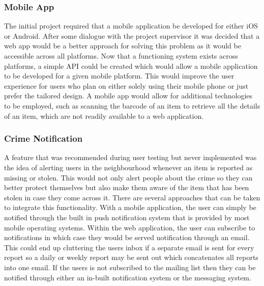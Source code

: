 \subsubsection{Mobile App}
The initial project required that a mobile application be developed for either iOS or Android. After some dialogue with the project supervisor it was decided that a web app would be a better approach for solving this problem as it would be accessible across all platforms. Now that a functioning system exists across platforms, a simple API could be created which would allow a mobile application to be developed for a given mobile platform. This would improve the user experience for users who plan on either solely using their mobile phone or just prefer the tailored design. A mobile app would allow for additional technologies to be employed, such as scanning the barcode of an item to retrieve all the details of an item, which are not readily available to a web application.

\subsubsection{Crime Notification}
A feature that was recommended during user testing but never implemented was the idea of alerting users in the neighbourhood whenever an item is reported as missing or stolen. This would not only alert people about the crime so they can better protect themselves but also make them aware of the item that has been stolen in case they come across it. There are several approaches that can be taken to integrate this functionality. With a mobile application, the user can simply be notified through the built in push notification system that is provided by most mobile operating systems. Within the web application, the user can subscribe to notifications in which case they would be served notification through an email. This could end up cluttering the users inbox if a separate email is sent for every report so a daily or weekly report may be sent out which concatenates all reports into one email. If the users is not subscribed to the mailing list then they can be notified through either an in-built notification system or the messaging system. 

